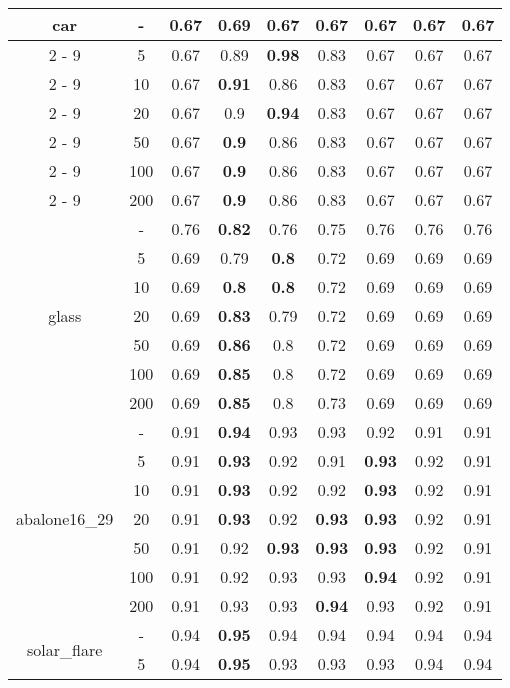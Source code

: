 \documentclass{article}%
\begin{document}
\begin{longtable}{c|c|ccccccc}
\hline%
\multirow{7}{*}{car}&{-}&0.67&\textbf{0.69}&0.67&0.67&0.67&0.67&0.67\\%
\cline{2%
-%
9}%
&5&0.67&0.89&\textbf{0.98}&0.83&0.67&0.67&0.67\\%
\cline{2%
-%
9}%
&10&0.67&\textbf{0.91}&0.86&0.83&0.67&0.67&0.67\\%
\cline{2%
-%
9}%
&20&0.67&0.9&\textbf{0.94}&0.83&0.67&0.67&0.67\\%
\cline{2%
-%
9}%
&50&0.67&\textbf{0.9}&0.86&0.83&0.67&0.67&0.67\\%
\cline{2%
-%
9}%
&100&0.67&\textbf{0.9}&0.86&0.83&0.67&0.67&0.67\\%
\cline{2%
-%
9}%
&200&0.67&\textbf{0.9}&0.86&0.83&0.67&0.67&0.67\\%
\hline%
\multirow{7}{*}{glass}&{-}&0.76&\textbf{0.82}&0.76&0.75&0.76&0.76&0.76\\%
\cline{2%
-%
9}%
&5&0.69&0.79&\textbf{0.8}&0.72&0.69&0.69&0.69\\%
\cline{2%
-%
9}%
&10&0.69&\textbf{0.8}&\textbf{0.8}&0.72&0.69&0.69&0.69\\%
\cline{2%
-%
9}%
&20&0.69&\textbf{0.83}&0.79&0.72&0.69&0.69&0.69\\%
\cline{2%
-%
9}%
&50&0.69&\textbf{0.86}&0.8&0.72&0.69&0.69&0.69\\%
\cline{2%
-%
9}%
&100&0.69&\textbf{0.85}&0.8&0.72&0.69&0.69&0.69\\%
\cline{2%
-%
9}%
&200&0.69&\textbf{0.85}&0.8&0.73&0.69&0.69&0.69\\%
\hline%
\multirow{7}{*}{abalone16\_29}&{-}&0.91&\textbf{0.94}&0.93&0.93&0.92&0.91&0.91\\%
\cline{2%
-%
9}%
&5&0.91&\textbf{0.93}&0.92&0.91&\textbf{0.93}&0.92&0.91\\%
\cline{2%
-%
9}%
&10&0.91&\textbf{0.93}&0.92&0.92&\textbf{0.93}&0.92&0.91\\%
\cline{2%
-%
9}%
&20&0.91&\textbf{0.93}&0.92&\textbf{0.93}&\textbf{0.93}&0.92&0.91\\%
\cline{2%
-%
9}%
&50&0.91&0.92&\textbf{0.93}&\textbf{0.93}&\textbf{0.93}&0.92&0.91\\%
\cline{2%
-%
9}%
&100&0.91&0.92&0.93&0.93&\textbf{0.94}&0.92&0.91\\%
\cline{2%
-%
9}%
&200&0.91&0.93&0.93&\textbf{0.94}&0.93&0.92&0.91\\%
\hline%
\multirow{7}{*}{solar\_flare}&{-}&0.94&\textbf{0.95}&0.94&0.94&0.94&0.94&0.94\\%
\cline{2%
-%
9}%
&5&0.94&\textbf{0.95}&0.93&0.93&0.93&0.94&0.94\\%

\end{longtable}
\end{document}
